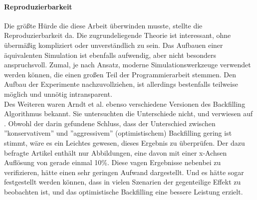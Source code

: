 \paragraph{Reproduzierbarkeit}
Die größte Hürde  die diese Arbeit überwinden musste, stellte die Reproduzierbarkeit da. Die zugrundeliegende Theorie ist interessant, ohne übermäßig kompliziert oder unverständlich zu sein. Das Aufbauen einer äquivalenten Simulation ist ebenfalls aufwendig, aber nicht besonders anspruchsvoll. Zumal, je nach Ansatz, moderne Simulationswerkzeuge verwendet werden können, die einen großen Teil der Programmierarbeit stemmen.
Den Aufbau der Experimente nachzuvollziehen, ist allerdings bestenfalls teilweise möglich und unnötig intransparent. \\
Des Weiteren waren Arndt et al. ebenso verschiedene Versionen des Backfilling Algorithmus bekannt. Sie untersuchten die Unterschiede nicht, und verwiesen auf \cite{optVsCons}. Obwohl der darin gefundene Schluss, dass der Unterschied zwischen ''konservativem'' und ''aggressivem'' (optimistischem) Backfilling gering ist stimmt, wäre es ein Leichtes gewesen, dieses Ergebnis zu überprüfen. Der dazu befragte Artikel enthält nur Abbildungen, eine davon mit einer x-Achsen Auflösung von gerade einmal 10\%. Diese vagen Ergebnisse nebenbei zu verifizieren, hätte einen sehr geringen Aufwand dargestellt. Und es hätte sogar festgestellt werden können, dass in vielen Szenarien der gegenteilige Effekt zu beobachten ist, und das optimistische Backfilling eine bessere Leistung erzielt.

